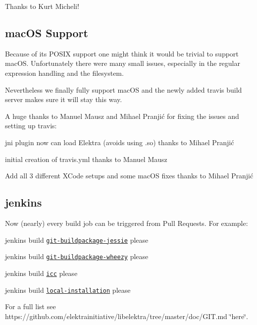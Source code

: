 Thanks to Kurt Micheli!

\subsection*{mac\+OS Support}

Because of its P\+O\+S\+IX support one might think it would be trivial to support mac\+OS. Unfortunately there were many small issues, especially in the regular expression handling and the filesystem.

Nevertheless we finally fully support mac\+OS and the newly added travis build server makes sure it will stay this way.

A huge thanks to Manuel Mausz and Mihael Pranjić for fixing the issues and setting up travis\+:


\begin{DoxyItemize}
\item jni plugin now can load Elektra (avoids using {\ttfamily .so}) thanks to Mihael Pranjić
\item initial creation of travis.\+yml thanks to Manuel Mausz
\item Add all 3 different X\+Code setups and some mac\+OS fixes thanks to Mihael Pranjić
\end{DoxyItemize}

\subsection*{jenkins}

Now (nearly) every build job can be triggered from Pull Requests. For example\+:


\begin{DoxyItemize}
\item jenkins build \href{https://build.libelektra.org/job/elektra-git-buildpackage-jessie/}{\tt git-\/buildpackage-\/jessie} please
\item jenkins build \href{https://build.libelektra.org/job/elektra-git-buildpackage-wheezy/}{\tt git-\/buildpackage-\/wheezy} please
\item jenkins build \href{https://build.libelektra.org/job/elektra-icc/}{\tt icc} please
\item jenkins build \href{https://build.libelektra.org/job/elektra-local-installation/}{\tt local-\/installation} please
\end{DoxyItemize}

For a full list see https\+://github.com/elektrainitiative/libelektra/tree/master/doc/\+G\+I\+T.\+md \char`\"{}here\char`\"{}.

